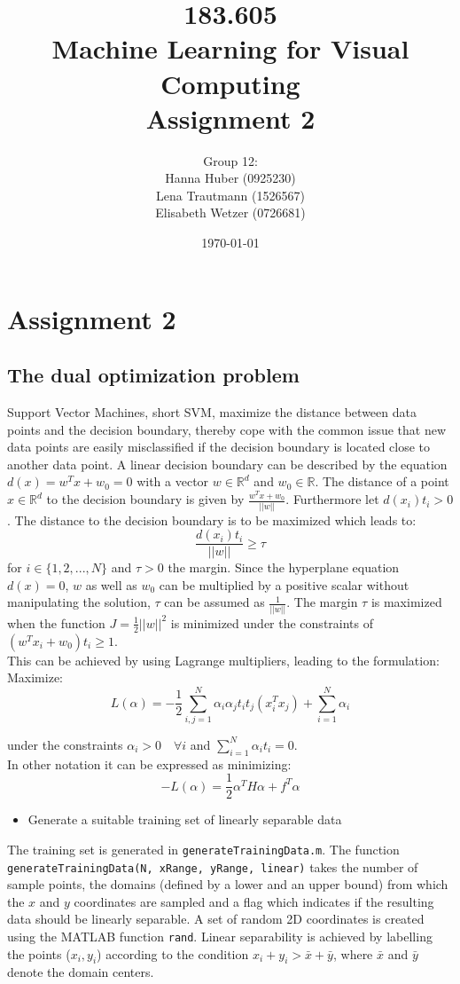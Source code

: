 \documentclass[a4]{article}
\title{\bf 183.605 \\ Machine Learning for Visual Computing \\ Assignment 2}
\author{Group 12: \\
	Hanna Huber (0925230) \\ Lena Trautmann (1526567) \\ Elisabeth Wetzer (0726681)}
\date{\today}
\begin{document}
\maketitle
\noindent

\section{Assignment 2}
\subsection{The dual optimization problem}
Support Vector Machines, short SVM, maximize the distance between data points and the decision boundary, thereby cope with the common issue that new data points are easily misclassified if the decision boundary is located close to another data point. A linear decision boundary can be described by the equation $d(x)=w^Tx+w_0=0$ with a vector $w \in \mathbb{R}^d$ and $w_0 \in \mathbb{R}$. The distance of a point $x \in \mathbb{R}^d$ to the decision boundary is given by $\frac{w^Tx+w_0}{||w||}$. Furthermore let $d(x_i)t_i>0$.
The distance to the decision boundary is to be maximized which leads to:
$$\frac{d(x_i)t_i}{||w||} \geq \tau$$
for $i \in \{1,2,..., N\}$ and $\tau >0$ the margin. Since the hyperplane equation $d(x)=0$, $w$ as well as $w_0$ can be multiplied by a positive scalar without manipulating the solution, $\tau$ can be assumed as $\frac{1}{||w||}$.
The margin $\tau$ is maximized when the function $J=\frac{1}{2} ||w||^2$ is minimized under the constraints of $(w^Tx_i+w_0)t_i \geq1$.\\
This can be achieved by using Lagrange multipliers, leading to the formulation:\\
Maximize:
 $$L(\alpha)=-\frac{1}{2} \sum_{i,j=1}^N \alpha_i \alpha_j t_i t_j (x_i^T x_j) + \sum_{i=1}^N \alpha_i$$
 
 under the constraints $\alpha_i >0 \quad \forall i$ and $\sum_{i=1}^N \alpha_i t_i =0$.\\
 
 In other notation it can be expressed as minimizing:
 $$-L(\alpha)=\frac{1}{2} \alpha^T H \alpha + f^T \alpha$$

\begin{itemize}
\item Generate a suitable training set of linearly separable data
\end{itemize}
The training set is generated in \texttt{generateTrainingData.m}. The function \texttt{generateTrainingData(N, xRange, yRange, linear)} takes the number of sample points, the domains (defined by a lower and an upper bound) from which the $x$ and $y$ coordinates are sampled and a flag which indicates if the resulting data should be linearly separable. A set of random 2D coordinates is created using the MATLAB function \texttt{rand}. Linear separability is achieved by labelling the points ($x_i,y_i$) according to the condition $ x_i + y_i > \bar{x} + \bar{y}$, where $\bar{x}$ and $\bar{y}$ denote the domain centers.
\end{document}
